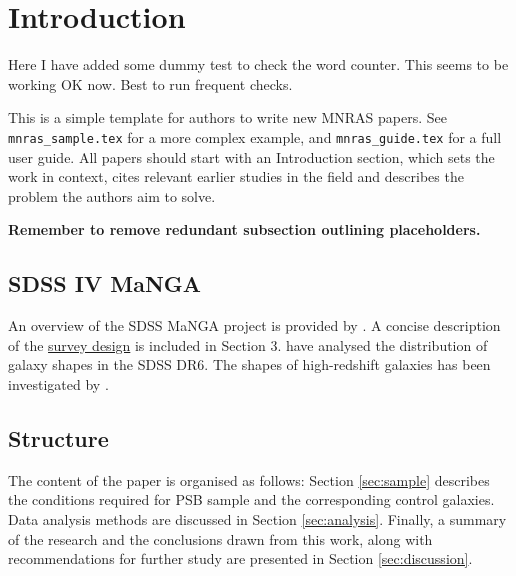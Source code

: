 \section{Introduction}
\label{sec:introduction}

Here I have added some dummy test to check the word counter. This seems to be working OK now. Best to run frequent checks.

This is a simple template for authors to write new MNRAS papers.
See \texttt{mnras\_sample.tex} for a more complex example, and \texttt{mnras\_guide.tex}
for a full user guide. All papers should start with an Introduction section, which sets the work in context, cites relevant earlier studies in the field and describes the problem the authors aim to solve.

\vspace{10pt}
\textbf{Remember to remove redundant subsection outlining placeholders.}

\subsection{SDSS IV MaNGA}
An overview of the SDSS MaNGA project is provided by \citet{2015ApJ...798....7B}. A concise description of the \href{https://iopscience.iop.org/article/10.1088/0004-637X/798/1/7/meta#apj504473s3}{survey design} is included in Section 3. \citet{2008MNRAS.388.1321P} have analysed the distribution of galaxy shapes in the SDSS DR6. The shapes of high-redshift galaxies has been investigated by \citet{2012ApJ...754L..24C}.



\subsection{Structure}
The content of the paper is organised as follows: Section \ref{sec:sample} describes the conditions required for PSB sample and the corresponding control galaxies. Data analysis methods are discussed in Section \ref{sec:analysis}. Finally, a summary of the research and the conclusions drawn from this work, along with recommendations for further study are presented in Section \ref{sec:discussion}.
